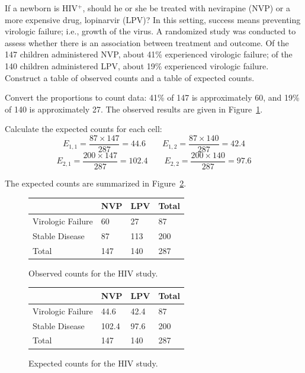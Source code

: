 
\begin{examplewrap}
\begin{nexample}{If a newborn is HIV$^+$, should he or she be treated with nevirapine (NVP) or a more expensive drug, lopinarvir (LPV)? In this setting, success means preventing virologic failure; i.e., growth of the virus. A randomized study was conducted to assess whether there is an association between treatment and outcome.\footnotemark{} Of the 147 children administered NVP, about 41\% experienced virologic failure; of the 140 children administered LPV, about 19\% experienced virologic failure. Construct a table of observed counts and a table of expected counts.}
	
Convert the proportions to count data: 41\% of 147 is approximately 60, and 19\% of 140 is approximately 27. The observed results are given in Figure~\ref{violariHivStudyObsCounts}.

Calculate the expected counts for each cell:
\[E_{1, 1} = \dfrac{87 \times 147}{287} = 44.6 \qquad E_{1, 2} = \dfrac{87 \times 140}{287} = 42.4 \]
\[E_{2, 1} = \dfrac{200 \times 147}{287} = 102.4 \qquad E_{2, 2} = \dfrac{200 \times 140}{287} = 97.6 \]

The expected counts are summarized in Figure~\ref{violariHivStudyExpCounts}.
\end{nexample}
\end{examplewrap}

\begin{figure}[h]
	\centering
	\begin{tabular}{l | l l | l}
	\hline
	& NVP & LPV & Total \\
	\hline
	Virologic Failure & 60 & 27 & 87 \\
	Stable Disease & 87 & 113 & 200 \\	
	\hline
	Total & 147 & 140 & 287 \\
	\hline
	\end{tabular}
	\caption{Observed counts for the HIV study.}
	\label{violariHivStudyObsCounts}
\end{figure}

\begin{figure}[h]
	\centering
	\begin{tabular}{l | l l | l}
		\hline
		& NVP & LPV & Total \\
		\hline
		Virologic Failure & 44.6 & 42.4 & 87 \\
		Stable Disease & 102.4 & 97.6 & 200 \\
		\hline	
		Total & 147 & 140 & 287 \\
		\hline
	\end{tabular}
	\caption{Expected counts for the HIV study.}
	\label{violariHivStudyExpCounts}
\end{figure}

